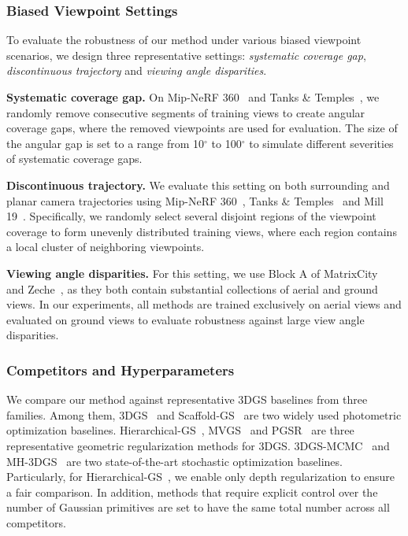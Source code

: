 \documentclass[lettersize,journal]{IEEEtran}
\begin{document}
\subsubsection{Biased Viewpoint Settings}

To evaluate the robustness of our method under various biased viewpoint scenarios, we design three representative settings: \emph{systematic coverage gap}, \emph{discontinuous trajectory} and \emph{viewing angle disparities}.

\textbf{Systematic coverage gap.}
On Mip-NeRF 360~\cite{mipnerf360} and Tanks \& Temples~\cite{tankstemples}, we randomly remove consecutive segments of training views to create angular coverage gaps, where the removed viewpoints are used for evaluation. 
The size of the angular gap is set to a range from 10$^\circ$ to 100$^\circ$ to simulate different severities of systematic coverage gaps.

\textbf{Discontinuous trajectory.}
We evaluate this setting on both surrounding and planar camera trajectories using Mip-NeRF 360~\cite{mipnerf360}, Tanks \& Temples~\cite{tankstemples} and Mill 19~\cite{meganerf}. Specifically, we randomly select several disjoint regions of the viewpoint coverage to form unevenly distributed training views, where each region contains a local cluster of neighboring viewpoints.

\textbf{Viewing angle disparities.}
For this setting, we use Block A of MatrixCity~\cite{matrixcity} and Zeche~\cite{isprs}, as they both contain substantial collections of aerial and ground views. In our experiments, all methods are trained exclusively on aerial views and evaluated on ground views to evaluate robustness against large view angle disparities.


\subsubsection{Competitors and Hyperparameters}

We compare our method against representative 3DGS baselines from three families. 
Among them, 3DGS~\cite{3dgs} and Scaffold-GS~\cite{scaffold} are two widely used photometric optimization baselines.
Hierarchical-GS~\cite{hierarchical}, MVGS~\cite{mvgs} and PGSR~\cite{pgsr} are three representative geometric regularization methods for 3DGS.
3DGS-MCMC~\cite{mcmc} and MH-3DGS~\cite{mh3dgs} are two state-of-the-art stochastic optimization baselines.
Particularly, for Hierarchical-GS~\cite{hierarchical}, we enable only depth regularization to ensure a fair comparison.
In addition, methods that require explicit control over the number of Gaussian primitives are set to have the same total number across all competitors. 
\end{document}
